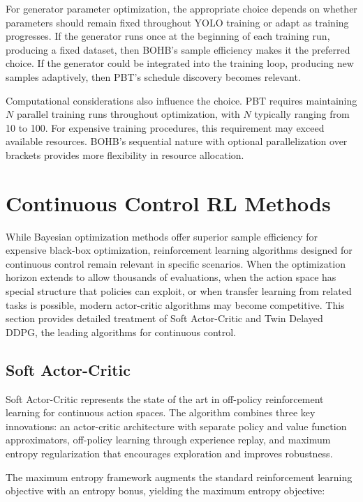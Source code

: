 For generator parameter optimization, the appropriate choice depends on whether parameters should remain fixed throughout YOLO training or adapt as training progresses. If the generator runs once at the beginning of each training run, producing a fixed dataset, then BOHB's sample efficiency makes it the preferred choice. If the generator could be integrated into the training loop, producing new samples adaptively, then PBT's schedule discovery becomes relevant.

Computational considerations also influence the choice. PBT requires maintaining $N$ parallel training runs throughout optimization, with $N$ typically ranging from 10 to 100. For expensive training procedures, this requirement may exceed available resources. BOHB's sequential nature with optional parallelization over brackets provides more flexibility in resource allocation.


\section{Continuous Control RL Methods}
\label{sec:continuous_control}

While Bayesian optimization methods offer superior sample efficiency for expensive black-box optimization, reinforcement learning algorithms designed for continuous control remain relevant in specific scenarios. When the optimization horizon extends to allow thousands of evaluations, when the action space has special structure that policies can exploit, or when transfer learning from related tasks is possible, modern actor-critic algorithms may become competitive. This section provides detailed treatment of Soft Actor-Critic and Twin Delayed DDPG, the leading algorithms for continuous control.

\subsection{Soft Actor-Critic}
\label{subsec:sac}

Soft Actor-Critic represents the state of the art in off-policy reinforcement learning for continuous action spaces. The algorithm combines three key innovations: an actor-critic architecture with separate policy and value function approximators, off-policy learning through experience replay, and maximum entropy regularization that encourages exploration and improves robustness.

The maximum entropy framework augments the standard reinforcement learning objective with an entropy bonus, yielding the maximum entropy objective:

